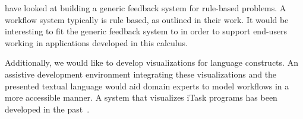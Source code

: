 \citet{DBLP:conf/sfp/NausJ16} have looked at building a generic feedback system for rule-based problems.
A workflow system typically is rule based, as outlined in their work.
It would be interesting to fit the generic feedback system to \TOPHAT in order to support end-users working in applications developed in this calculus.

Additionally, we would like to develop visualizations for \TOPHAT language constructs.
An assistive development environment integrating these visualizations and the presented textual language
would aid domain experts to model workflows in a more accessible manner.
A system that visualizes iTask programs has been developed in the past~\cite{DBLP:conf/sfp/StutterheimPA14}.

